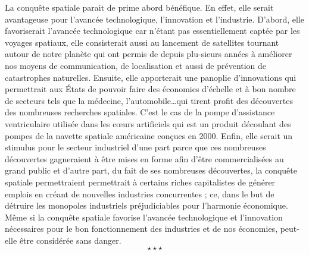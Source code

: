 \hspace*{0.5cm}La conquête spatiale parait de prime abord bénéfique. En effet, elle serait avantageuse pour l’avancée technologique, l’innovation et l’industrie. D’abord, elle favoriserait l’avancée technologique car n’étant pas essentiellement captée par les voyages spatiaux, elle consisterait aussi au lancement de satellites tournant autour de notre planète qui ont permis de depuis plu-sieurs années à améliorer nos moyens de communication, de localisation et aussi de prévention de catastrophes naturelles. Ensuite, elle apporterait une panoplie d’innovations qui permettrait aux États de pouvoir faire des économies d’échelle et à bon nombre de secteurs tels que la médecine, l’automobile…qui tirent profit des découvertes des nombreuses recherches spatiales. C’est le cas de la pompe d’assistance ventriculaire utilisée dans les cœurs artificiels qui est un produit découlant des pompes de la navette spatiale américaine conçues en 2000. Enfin, elle serait un stimulus pour le secteur industriel d’une part parce que ces nombreuses découvertes gagneraient à être mises en forme afin d’être commercialisées au grand public et d’autre part, du fait de ses nombreuses découvertes, la conquête spatiale permettraient permettrait à certains riches capitalistes de générer emplois en créant de nouvelles industries concurrentes ; ce, dans le but de détruire les monopoles industriels préjudiciables pour l’harmonie économique.\\
\hspace*{0.5cm}Même si la conquête spatiale favorise l’avancée technologique et l’innovation nécessaires pour le bon fonctionnement des industries et de nos économies, peut-elle être considérée sans danger.
$$\star \star \star$$
